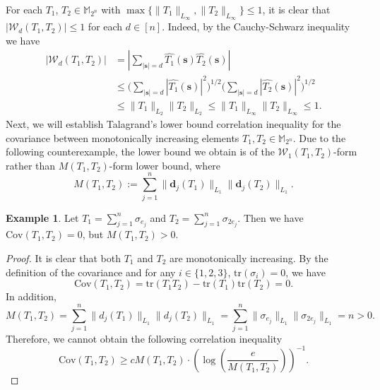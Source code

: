 \documentclass{amsbook}
\theoremstyle{definition}
\newtheorem{example}[theorem]{Example}
\theoremstyle{remark}
\numberwithin{section}{chapter}
\numberwithin{equation}{chapter}
\newcommand{\M}{\mathbb{M}}
\newcommand{\1}{\mathbf{1}}
\newcommand{\s}{\mathbf{s}}
\newcommand{\dc}{\mathbf{d}}
\begin{document}
For each $T_1$, $T_2\in \M_{2^{n}}$ with $\max\{\|T_1\|_{L_{\infty}},\|T_2\|_{L_{\infty}}\}\leq 1$, 
it is clear that $\left|\mathcal{W}_{d}(T_1,T_2)\right|\leq 1$ for each $d\in [n]$. Indeed, by the Cauchy-Schwarz inequality we have
\begin{equation}\label{upper-bound-1}
	\begin{split}
		|\mathcal{W}_{d}(T_1,T_2)|&=\left|\sum_{|\s|=d}\widehat{T_1}(\s)\widehat{T_2}(\s)\right|\\
		&\leq\Big(\sum_{|\s|=d}|\widehat{T_1}(\s)|^{2}\Big)^{1/2}\Big(\sum_{|\s|=d}|\widehat{T_2}(\s)|^{2}\Big)^{1/2}\\
		&\leq\|T_1\|_{L_{2}}\|T_2\|_{L_{2}}\leq \|T_1\|_{L_{\infty}}\|T_2\|_{L_{\infty}}\leq 1.
	\end{split}
\end{equation}
Next, we will establish  Talagrand's lower bound correlation inequality for the covariance between monotonically increasing elements $T_1,T_2\in\mathbb{M}_{2^n}$. Due to the following counterexample, the lower bound we obtain is of the $\mathcal{W}_{1}(T_1,T_2)$-form rather than 
$M(T_1,T_2)$-form lower bound,
where 
$$M(T_1,T_2):=\sum_{j=1}^n\|\dc_{j}(T_1)\|_{L_{1}}\|\dc_{j}(T_2)\|_{L_{1}}.$$





\begin{example}\label{example-2} 
Let $T_1=\sum_{j=1}^n\sigma_{e_{j}}$ and $T_2=\sum_{j=1}^n\sigma_{2e_{j}}$. Then we have $\mathrm{Cov}(T_1,T_2)=0$, but $M(T_1,T_2)>0$.
\end{example}
\begin{proof}
	It is clear that both $T_1$ and $T_2$ are monotonically increasing. By the definition of the covariance and for any $i\in\{1,2,3\}$, $\mathrm{tr}(\sigma_i)=0$, we have
	$$\mathrm{Cov}(T_1,T_2)=\mathrm{tr}(T_1T_2)-\mathrm{tr}(T_1)\mathrm{tr}(T_2)=0.$$
	In addition,  
	$$M(T_1,T_2)=\sum_{j=1}^n\|d_{j}(T_1)\|_{L_{1}}\|d_{j}(T_2)\|_{L_{1}}=\sum_{j=1}^n\|\sigma_{e_j}\|_{L_{1}}\|\sigma_{2e_j}\|_{L_{1}}=n>0.$$
	Therefore, we cannot obtain the following correlation inequality
	$$\mathrm{Cov}(T_1,T_2)\geq c M(T_1,T_2)\cdot\left(\log\left(\frac{e}{M(T_1,T_2)}\right)\right)^{-1}.$$
\end{proof}
\end{document}
